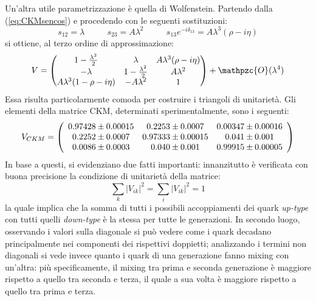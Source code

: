 \documentclass{subnucbo}
\begin{document}
Un'altra utile parametrizzazione è quella di Wolfenstein. Partendo dalla (\ref{eq:CKMsencos}) e procedendo con le seguenti sostituzioni:
\begin{equation}
        s_{12}=\lambda\,\,\,\,\,\,\,\,\,\,\,\,\,\,\,\,s_{23}=A\lambda^2\,\,\,\,\,\,\,\,\,\,\,\,\,\,\,\,s_{13}e^{-i\delta_{13}}=A\lambda^3(\rho-i\eta)
        \label{eq:parametriWolfenstein}
\end{equation}
si ottiene, al terzo ordine di approssimazione:
\begin{equation}
        V=
        \begin{pmatrix}
                1-\frac{\lambda^2}{2} & \lambda & A\lambda^3(\rho-i\eta)\\
                -\lambda & 1-\frac{\lambda^2}{2} & A\lambda^2\\
                A\lambda^3(1-\rho-i\eta) & -A\lambda^2 & 1
        \end{pmatrix}
        +\mathpzc{O}(\lambda^4)
        \label{eq:CKMWolfenstein}
\end{equation}
Essa risulta particolarmente comoda per costruire i triangoli di unitarietà.
Gli elementi della matrice CKM, determinati sperimentalmente, sono i seguenti:
\begin{equation}
        V _ { C K M } = \left( \begin{array} { c c c } { 0.97428 \pm 0.00015 } & { 0.2253 \pm 0.0007 } & { 0.00347 \pm 0.00016 } \\ { 0.2252 \pm 0.0007 } & { 0.97333 \pm 0.00015 } & { 0.041 \pm 0.001 } \\ { 0.0086 \pm 0.0003 } & { 0.040 \pm 0.001 } & { 0.99915 \pm 0.00005 } \end{array} \right)
        \label{eq:ckm_values}
\end{equation}
In base a questi, si evidenziano due fatti importanti: innanzitutto è verificata con buona precisione la condizione di unitarietà della matrice:
\begin{equation}
        \sum _ { k } \left| V _ { i k } \right| ^ { 2 } = \sum _ { i } \left| V _ { i k } \right| ^ { 2 } = 1
        \label{eq:weak_universality_ckm}
\end{equation}
la quale implica che la somma di tutti i possibili accoppiamenti dei quark \textit{up-type} con tutti quelli \textit{down-type} è la stessa per tutte le generazioni. In secondo luogo, osservando i valori sulla diagonale si può vedere come i quark decadano principalmente nei componenti dei rispettivi doppietti; analizzando i termini non diagonali si vede invece quanto i quark di una generazione fanno mixing con un'altra: più specificamente, il mixing tra prima e seconda generazione è maggiore rispetto a quello tra seconda e terza, il quale a sua volta è maggiore rispetto a quello tra prima e terza.
\end{document}
